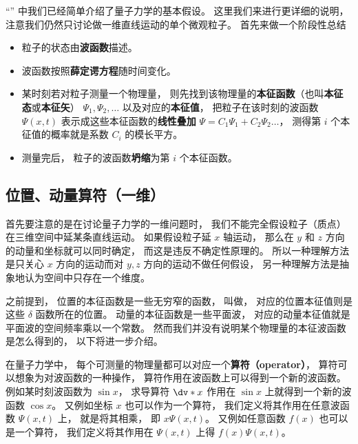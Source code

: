 


“” 中我们已经简单介绍了量子力学的基本假设。 这里我们来进行更详细的说明， 注意我们仍然只讨论做一维直线运动的单个微观粒子。 首先来做一个阶段性总结
\begin{itemize}
\item 粒子的状态由\textbf{波函数}描述。
\item 波函数按照\textbf{薛定谔方程}随时间变化。
\item 某时刻若对粒子测量一个物理量， 则先找到该物理量的\textbf{本征函数}（也叫\textbf{本征态}或\textbf{本征矢}） $\Psi_1, \Psi_2, \dots$ 以及对应的\textbf{本征值}， 把粒子在该时刻的波函数 $\Psi(x, t)$ 表示成这些本征函数的\textbf{线性叠加} $\Psi = C_1 \Psi_1 + C_2 \Psi_2\dots$， 测得第 $i$ 个本征值的概率就是系数 $C_i$ 的模长平方。
\item 测量完后， 粒子的波函数\textbf{坍缩}为第 $i$ 个本征函数。
\end{itemize}

\subsection{位置、动量算符（一维）}
首先要注意的是在讨论量子力学的一维问题时， 我们不能完全假设粒子（质点）在三维空间中延某条直线运动。 如果假设粒子延 $x$ 轴运动， 那么在 $y$ 和 $z$ 方向的动量和坐标就可以同时确定， 而这是违反不确定性原理的。 所以一种理解方法是只关心 $x$ 方向的运动而对 $y,z$ 方向的运动不做任何假设， 另一种理解方法是抽象地认为空间中只存在一个维度。

之前提到， 位置的本征函数是一些无穷窄的函数， 叫做， 对应的位置本征值则是这些 $\delta$ 函数所在的位置。 动量的本征函数是一些平面波， 对应的动量本征值就是平面波的空间频率乘以一个常数。 然而我们并没有说明某个物理量的本征波函数是怎么得到的， 以下将进一步介绍。

在量子力学中， 每个可测量的物理量都可以对应一个\textbf{算符（operator）}， 算符可以想象为对波函数的一种操作， 算符作用在波函数上可以得到一个新的波函数。 例如某时刻波函数为 $\sin x$， 求导算符 $\dv*{x}$ 作用在 $\sin x$ 上就得到一个新的波函数 $\cos x$。 又例如坐标 $x$ 也可以作为一个算符， 我们定义将其作用在任意波函数 $\Psi(x, t)$ 上， 就是将其相乘， 即 $x\Psi(x, t)$。 又例如任意函数 $f(x)$ 也可以是一个算符， 我们定义将其作用在 $\Psi(x, t)$ 上得 $f(x)\Psi(x, t)$。

